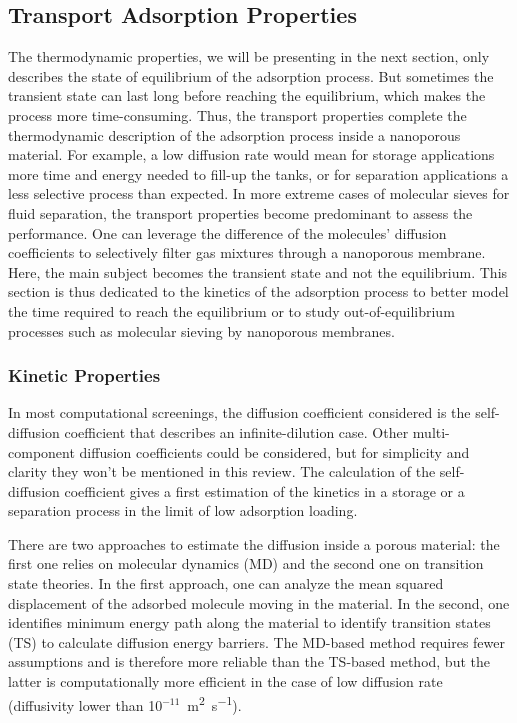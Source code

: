 \documentclass[main.tex]{subfiles}
\begin{document}
\subsection{Transport Adsorption Properties}

The thermodynamic properties, we will be presenting in the next section, only describes the state of equilibrium of the adsorption process. But sometimes the transient state can last long before reaching the equilibrium, which makes the process more time-consuming. Thus, the transport properties complete the thermodynamic description of the adsorption process inside a nanoporous material. For example, a low diffusion rate would mean for storage applications more time and energy needed to fill-up the tanks, or for separation applications a less selective process than expected. In more extreme cases of molecular sieves for fluid separation, the transport properties become predominant to assess the performance. One can leverage the difference of the molecules' diffusion coefficients to selectively filter gas mixtures through a nanoporous membrane.\cite{Miandoab_2021} Here, the main subject becomes the transient state and not the equilibrium. This section is thus dedicated to the kinetics of the adsorption process to better model the time required to reach the equilibrium or to study out-of-equilibrium processes such as molecular sieving by nanoporous membranes.

\subsubsection{Kinetic Properties}

In most computational screenings, the diffusion coefficient considered is the self-diffusion coefficient that describes an infinite-dilution case. Other multi-component diffusion coefficients could be considered, but for simplicity and clarity they won't be mentioned in this review. The calculation of the self-diffusion coefficient gives a first estimation of the kinetics in a storage or a separation process in the limit of low adsorption loading.

There are two approaches to estimate the diffusion inside a porous material: the first one relies on molecular dynamics (MD) and the second one on transition state theories. In the first approach, one can analyze the mean squared displacement of the adsorbed molecule moving in the material. In the second, one identifies minimum energy path along the material to identify transition states (TS) to calculate diffusion energy barriers. The MD-based method requires fewer assumptions and is therefore more reliable than the TS-based method, but the latter is computationally more efficient in the case of low diffusion rate (diffusivity lower than 10$^{-11}$~\si{\square\meter\per\second}).
\end{document}
